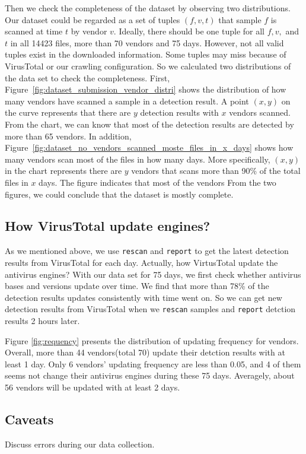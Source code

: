 Then we check the completeness of the dataset by observing two distributions. 
Our dataset could be regarded as a set of tuples $(f, v, t)$ that sample $f$ is scanned at time $t$ by vendor $v$. Ideally, there should be one tuple for all $f, v, $ and $t$ in all 14423 files, more than 70 vendors and 75 days. 
However, not all valid tuples exist in the downloaded information. Some tuples may miss because of VirusTotal or our crawling configuration. So we calculated two distributions of the data set to check the completeness.
First, Figure~\ref{fig:dataset_submission_vendor_distri} shows the distribution of how many vendors have scanned a sample in a detection result. A point $(x, y)$ on the curve represents that there are $y$ detection results with $x$ vendors scanned. From the chart, we can know that most of the detection results are detected by more than 65 vendors. 
In addition, Figure~\ref{fig:dataset_no_vendors_scanned_moste_files_in_x_days} shows  how many vendors scan most of the files in how many days. More specifically, $(x, y)$ in the chart represents there are $y$ vendors that scans more than 90\% of the total files in $x$ days. The figure indicates that most of the vendors 
From the two figures, we could conclude that the dataset is mostly complete.



\subsection{How VirusTotal update engines?}
As we mentioned above, we use \texttt{rescan} and \texttt{report} to get the latest detection results from VirusTotal for each day. Actually, how VirtusTotal update the antivirus engines? With our data set for 75 days, we first check whether antivirus bases and versions update over time. We find that more than 78\% of the detection results updates consistently with time went on. So we can get new detection results from VirusTotal when we \texttt{rescan} samples and \texttt{report} detction results 2 hours later.




Figure \ref{fig:requency} presents the distribution of updating frequency for vendors. Overall, more than 44 vendors(total 70) update their detction results with at least 1 day. Only 6 vendors' updating frequency are less than 0.05, and 4 of them seems not change their antivirus engines during these 75 days. Averagely, about 56 vendors will be updated with at least 2 days. 

\subsection{Caveats}

Discuss errors during our data collection. 
